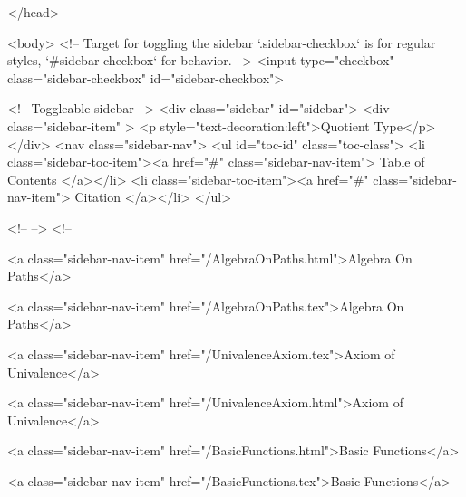   
</head>




  <body>
    <!-- Target for toggling the sidebar `.sidebar-checkbox` is for regular
     styles, `#sidebar-checkbox` for behavior. -->
<input type="checkbox" class="sidebar-checkbox" id="sidebar-checkbox">

<!-- Toggleable sidebar -->
<div class="sidebar" id="sidebar">
  <div class="sidebar-item" >
    <p style="text-decoration:left">Quotient Type</p>
  </div>
  <nav class="sidebar-nav">
    <ul id="toc-id" class="toc-class">
  <li class="sidebar-toc-item"><a href="#" class="sidebar-nav-item"> Table of Contents </a></li>
  <li class="sidebar-toc-item"><a href="#" class="sidebar-nav-item"> Citation </a></li>
</ul>


    <!--  -->
    <!-- 
      
    
      
    
      
    
      
        
      
    
      
        
          <a class="sidebar-nav-item" href="/AlgebraOnPaths.html">Algebra On Paths</a>
        
      
    
      
        
          <a class="sidebar-nav-item" href="/AlgebraOnPaths.tex">Algebra On Paths</a>
        
      
    
      
        
          <a class="sidebar-nav-item" href="/UnivalenceAxiom.tex">Axiom of Univalence</a>
        
      
    
      
        
          <a class="sidebar-nav-item" href="/UnivalenceAxiom.html">Axiom of Univalence</a>
        
      
    
      
        
          <a class="sidebar-nav-item" href="/BasicFunctions.html">Basic Functions</a>
        
      
    
      
        
          <a class="sidebar-nav-item" href="/BasicFunctions.tex">Basic Functions</a>
        
      
    
      
        
